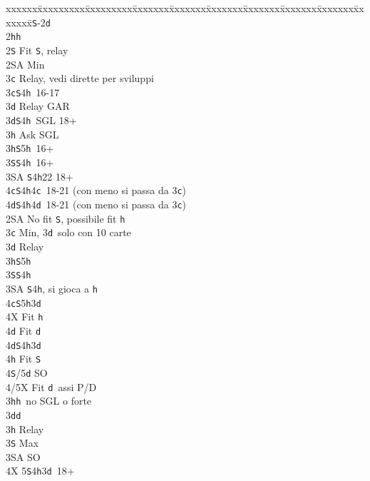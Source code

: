 \documentclass[a4paper,italian]{article}
\newcommand{\BS}{\small{\texttt{S}}}
\newcommand{\BC}{\small{\texttt{c}}}
\newcommand{\BD}{\small{\texttt{d}}}
\newcommand{\BH}{\small{\texttt{h}}}
\newenvironment{bidtable}
{\begin{tabbing}

    xxxxxx\=xxxxxxxxx\=xxxxxxxxx\=xxxxxxx\=xxxxxxx\=xxxxxxx\=xxxxxxx\=xxxxxxx\=xxxxxxx\=xxxxxxx\=\kill}
{\end{tabbing} }%
\begin{document}
\begin{multicols}{2}
    \begin{bidtable}
        1\BS-2\BD\\
        2\BH {}\BH \+\\
        2\BS \> Fit \BS , relay\+\\
        2\small{SA} \> Min\+\\
        3\BC \> Relay, vedi dirette per sviluppi\-\\
        3\BC {}\BS 4\BH\ 16-17\+\\
        3\BD \> Relay GAR\-\\
        3\BD {}\BS 4\BH\ SGL 18+\+\\
        3\BH \> Ask SGL\-\\
        3\BH {}\BS 5\BH\ 16+\\
        3\BS {}\BS 4\BH\ 16+\\
        3\small{SA} \BS 4\BH 22 18+\\
        4\BC {}\BS 4\BH 4\BC\ 18-21 (con meno si passa da 3\BC )\\
        4\BD {}\BS 4\BH 4\BD\ 18-21 (con meno si passa da 3\BC )\-\\
        2\small{SA} \> No fit \BS , possibile fit \BH \+\\
        3\BC \> Min, 3\BD\ solo con 10 carte\+\\
        3\BD \> Relay\+\\
        3\BH {}\BS 5\BH \\
        3\BS {}\BS 4\BH \\
        3\small{SA} \BS 4\BH , si gioca a \BH \\
        4\BC {}\BS5\BH3\BD \+\\
        4X \> Fit \BH\\
        4\BD \> Fit \BD\-\\
        4\BD {}\BS 4\BH 3\BD\+\\
        4\BH \> Fit \BS\\
        4\BS/5\BD \> SO\\
        4/5X \> Fit \BD\ assi P/D\-\-\\
        3\BH {}\BH\ no SGL o forte\-\\
        3\BD {}\BD \+\\
        3\BH \> Relay\+\\
        3\BS \> Max\+\\
        3\small{SA} \> SO\+\\
        4X 5\BS 4\BH 3\BD\ 18+\-\-\\

\end{bidtable}
\end{multicols}
\end{document}

